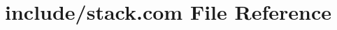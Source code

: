 \hypertarget{home_2abonfi_2_c_f_d__codes_2_eul_f_s_83_84_2include_2stack_8com}{\section{include/stack.com File Reference}
\label{home_2abonfi_2_c_f_d__codes_2_eul_f_s_83_84_2include_2stack_8com}
}
